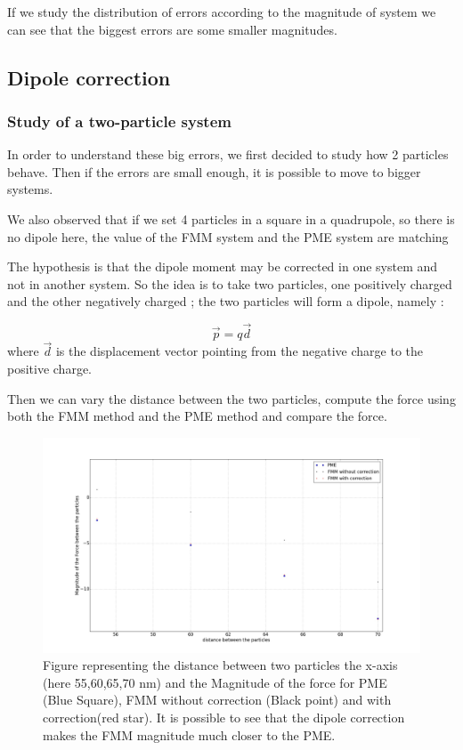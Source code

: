 \documentclass[11pt,twoside,a4paper]{report}
\begin{document}
	If we study the distribution of errors according to the magnitude of system we can see that the biggest errors are some smaller magnitudes.
	

	
\subsection{Dipole correction}
\subsubsection{Study of a two-particle system}
	In order to understand these big errors, we first decided to study how 2 particles behave. Then if the errors are small enough, it is possible to move to bigger systems.
	
We also observed that if we set 4 particles in a square in a quadrupole, so there is no dipole here, the value of the FMM system and the PME system are matching




 	
	
The hypothesis is that the dipole moment may be corrected in one system and not in another system. So the idea is to take two particles, one positively charged and the other negatively charged ; the two particles will form a dipole, namely : 

\begin{equation}
	\vec{p} = q \vec{d}
\end{equation}	
	where $\vec{d}$ is the displacement vector pointing from the negative charge to the positive charge. 
	
	Then we can vary the distance between the two particles, compute the force using both the FMM method and the PME method and compare the force.
	
	
	\begin{figure}[H]
	   \includegraphics[scale=0.2]{dipoleCorrection}
    \centering 
    \caption{Figure representing the distance between two particles the x-axis (here 55,60,65,70 nm) and the  Magnitude of the force for PME (Blue Square), FMM without correction (Black point) and with correction(red star).
     It is possible to see that the dipole correction makes the FMM magnitude much closer to the PME.}    
   \end{figure}  	
	
\end{document}
